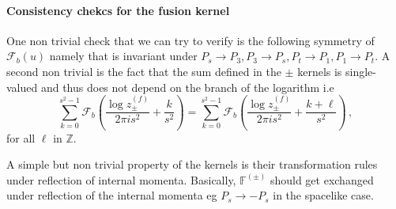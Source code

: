 \documentclass[11pt]{article}
\begin{document}
\paragraph{Consistency chekcs for the fusion kernel}

One non trivial check that we can try to verify is the following symmetry of $\mathcal{F}_{b}(u)$ namely that is invariant under $P_s\rightarrow P_3,P_3\rightarrow P_s,P_t\rightarrow P_1,P_1\rightarrow P_t$. A second non trivial is the fact that the sum defined in the $\pm$ kernels is single-valued and thus does not depend on the branch of the logarithm i.e
\begin{equation}
    \sum_{k=0}^{s^2-1} \mathcal{F}_b\left(\frac{\log z_{\pm}^{(f)}}{2\pi i s^2}+\frac{k}{s^2}\right)=\sum_{k=0}^{s^2-1} \mathcal{F}_b\left(\frac{\log z_{\pm}^{(f)}}{2\pi i s^2}+\frac{k+\ell}{s^2}\right)\,,
\end{equation}
for all $\ell$ in $\mathbb{Z}$.

A simple but non trivial property of the kernels is their transformation rules under reflection of internal momenta. Basically, $\mathbb{F}^{(\pm)}$ should get exchanged under reflection of the internal momenta eg $P_s\rightarrow-P_s$ in the spacelike case.
\end{document}
